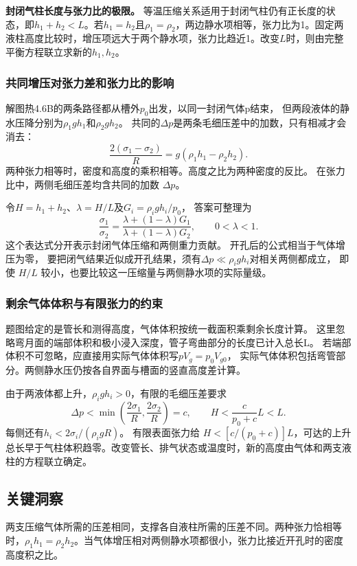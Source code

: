\documentclass[UTF8,fontset=fandol,a4paper,11pt]{ctexart}
\begin{document}
\textbf{封闭气柱长度与张力比的极限。} 等温压缩关系适用于封闭气柱仍有正长度的状态，即$h_1+h_2<L$。若$h_1=h_2$且$\rho_1=\rho_2$，两边静水项相等，张力比为1。固定两液柱高度比较时，增压项远大于两个静水项，张力比趋近1。改变$L$时，则由完整平衡方程联立求新的$h_1,h_2$。
\subsubsection*{共同增压对张力差和张力比的影响}
解图热4.6B的两条路径都从槽外$p_0$出发，以同一封闭气体p结束，
但两段液体的静水压降分别为$\rho_1gh_1$和$\rho_2gh_2$。
共同的$\Delta p$是两条毛细压差中的加数，只有相减才会消去：
\[
\frac{2(\sigma_1-\sigma_2)}R
=g(\rho_1h_1-\rho_2h_2).
\]
两种张力相等时，密度和高度的乘积相等。高度之比为两种密度的反比。
在张力比中，两侧毛细压差均含共同的加数 $\Delta p$。

令$H=h_1+h_2$、$\lambda=H/L$及$G_i=\rho_igh_i/p_0$，
答案可整理为
\[
\frac{\sigma_1}{\sigma_2}
=\frac{\lambda+(1-\lambda)G_1}
{\lambda+(1-\lambda)G_2},\qquad0<\lambda<1.
\]
这个表达式分开表示封闭气体压缩和两侧重力贡献。
开孔后的公式相当于气体增压为零，
要把闭气结果近似成开孔结果，须有$\Delta p\ll\rho_igh_i$对相关两侧都成立，
即使 $H/L$ 较小，也要比较这一压缩量与两侧静水项的实际量级。

\subsubsection*{剩余气体体积与有限张力的约束}
题图给定的是管长和测得高度，气体体积按统一截面积乘剩余长度计算。
这里忽略弯月面的端部体积和极小浸入深度，管子弯曲部分的长度已计入总长L。
若端部体积不可忽略，应直接用实际气体体积写$pV_g=p_0V_{g0}$，
实际气体体积包括弯管部分。两侧静水压仍按各自界面与槽面的竖直高度差计算。

由于两液体都上升，$\rho_igh_i>0$，有限的毛细压差要求
\[
\Delta p<\min\left(\frac{2\sigma_1}R,\frac{2\sigma_2}R\right)=c,
\qquad H<\frac{c}{p_0+c}L<L.
\]
每侧还有$h_i<2\sigma_i/(\rho_i gR)$。
有限表面张力给 $H<[c/(p_0+c)]L$，可达的上升总长早于气柱体积趋零。改变管长、排气状态或温度时，新的高度由气体和两支液柱的方程联立确定。




\subsection*{关键洞察}

两支压缩气体所需的压差相同，支撑各自液柱所需的压差不同。两种张力恰相等时，$\rho_1h_1=\rho_2h_2$。当气体增压相对两侧静水项都很小，张力比接近开孔时的密度高度积之比。
\end{document}

